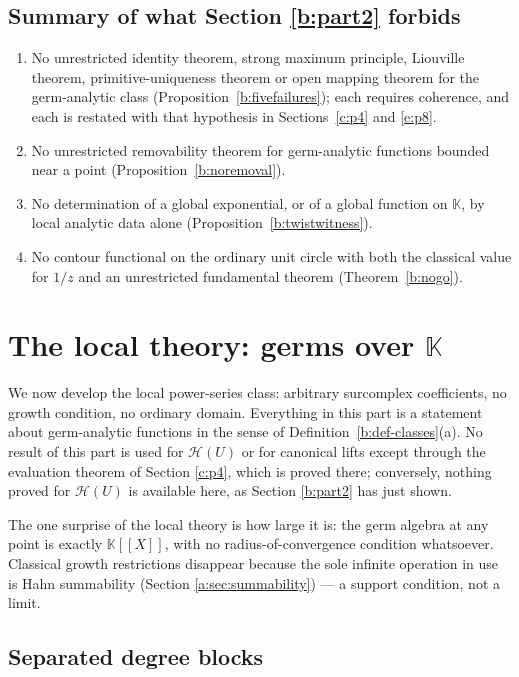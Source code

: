 \documentclass[11pt,a4paper]{article}
\numberwithin{equation}{section}
\theoremstyle{definition}
\theoremstyle{remark}
\theoremstyle{plain}
\newcommand{\K}{\mathbb K}
\newcommand{\Hc}{\mathcal H}
\begin{document}
\subsection{Summary of what Section \ref{b:part2} forbids}

\begin{enumerate}[label=\textup{(\arabic*)},leftmargin=2.4em]
\item No unrestricted identity theorem, strong maximum principle,
Liouville theorem, primitive-uniqueness theorem or open mapping theorem
for the germ-analytic class (Proposition~\ref{b:fivefailures}); each
requires coherence, and each is restated with that hypothesis in Sections~\ref{c:p4} and \ref{e:p8}.
\item No unrestricted removability theorem for germ-analytic functions
bounded near a point (Proposition~\ref{b:noremoval}).
\item No determination of a global exponential, or of a global function on
$\K$, by local analytic data alone (Proposition~\ref{b:twistwitness}).
\item No contour functional on the ordinary unit circle with both the
classical value for $1/z$ and an unrestricted fundamental theorem
(Theorem~\ref{b:nogo}).
\end{enumerate}

\section{The local theory: germs over \texorpdfstring{$\K$}{K}}
\label{b:part3}

We now develop the local power-series class: arbitrary surcomplex
coefficients, no growth condition, no ordinary domain. Everything in this
part is a statement about germ-analytic functions in the sense of
Definition~\ref{b:def-classes}(a). No result of this part is used for
$\Hc(U)$ or for canonical lifts except through the evaluation theorem of
Section \ref{c:p4}, which is proved there; conversely, nothing proved for
$\Hc(U)$ is available here, as Section \ref{b:part2} has just shown.

The one surprise of the local theory is how large it is: the germ algebra
at any point is exactly $\K[[X]]$, with no radius-of-convergence condition
whatsoever. Classical growth restrictions disappear because the sole
infinite operation in use is Hahn summability (Section \ref{a:sec:summability}) --- a
support condition, not a limit.

\subsection{Separated degree blocks}
\end{document}
